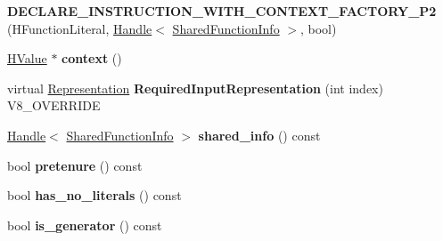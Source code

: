 \begin{DoxyCompactItemize}
\item 
\hypertarget{classv8_1_1internal_1_1_v8___f_i_n_a_l_ace687f4e93432fba09275c018bc0e305}{}{\bfseries D\+E\+C\+L\+A\+R\+E\+\_\+\+I\+N\+S\+T\+R\+U\+C\+T\+I\+O\+N\+\_\+\+W\+I\+T\+H\+\_\+\+C\+O\+N\+T\+E\+X\+T\+\_\+\+F\+A\+C\+T\+O\+R\+Y\+\_\+\+P2} (H\+Function\+Literal, \hyperlink{classv8_1_1internal_1_1_handle}{Handle}$<$ \hyperlink{classv8_1_1internal_1_1_shared_function_info}{Shared\+Function\+Info} $>$, bool)\label{classv8_1_1internal_1_1_v8___f_i_n_a_l_ace687f4e93432fba09275c018bc0e305}

\item 
\hypertarget{classv8_1_1internal_1_1_v8___f_i_n_a_l_a911a04b75b22f133c5eb5eafcc2d5f87}{}\hyperlink{classv8_1_1internal_1_1_h_value}{H\+Value} $\ast$ {\bfseries context} ()\label{classv8_1_1internal_1_1_v8___f_i_n_a_l_a911a04b75b22f133c5eb5eafcc2d5f87}

\item 
\hypertarget{classv8_1_1internal_1_1_v8___f_i_n_a_l_a6c6d1f37f40b113d8f4062f1ffff7215}{}virtual \hyperlink{classv8_1_1internal_1_1_representation}{Representation} {\bfseries Required\+Input\+Representation} (int index) V8\+\_\+\+O\+V\+E\+R\+R\+I\+D\+E\label{classv8_1_1internal_1_1_v8___f_i_n_a_l_a6c6d1f37f40b113d8f4062f1ffff7215}

\item 
\hypertarget{classv8_1_1internal_1_1_v8___f_i_n_a_l_a8d314c57ed592673975db3dfecd4cb91}{}\hyperlink{classv8_1_1internal_1_1_handle}{Handle}$<$ \hyperlink{classv8_1_1internal_1_1_shared_function_info}{Shared\+Function\+Info} $>$ {\bfseries shared\+\_\+info} () const \label{classv8_1_1internal_1_1_v8___f_i_n_a_l_a8d314c57ed592673975db3dfecd4cb91}

\item 
\hypertarget{classv8_1_1internal_1_1_v8___f_i_n_a_l_a97539f6450e3ada1eb3201b76ca93c5c}{}bool {\bfseries pretenure} () const \label{classv8_1_1internal_1_1_v8___f_i_n_a_l_a97539f6450e3ada1eb3201b76ca93c5c}

\item 
\hypertarget{classv8_1_1internal_1_1_v8___f_i_n_a_l_ab0f28ef27d575eb723784a33119b71cf}{}bool {\bfseries has\+\_\+no\+\_\+literals} () const \label{classv8_1_1internal_1_1_v8___f_i_n_a_l_ab0f28ef27d575eb723784a33119b71cf}

\item 
\hypertarget{classv8_1_1internal_1_1_v8___f_i_n_a_l_af63fdaba80e9c3e847c94814fa029c15}{}bool {\bfseries is\+\_\+generator} () const \label{classv8_1_1internal_1_1_v8___f_i_n_a_l_af63fdaba80e9c3e847c94814fa029c15}


\end{DoxyCompactItemize}
